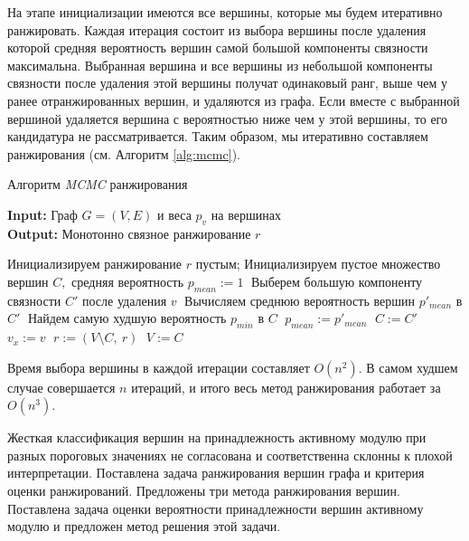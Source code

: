 На этапе инициализации имеются все вершины, которые мы будем итеративно
ранжировать.  Каждая итерация состоит из выбора вершины после удаления которой
средняя вероятность вершин самой большой компоненты связности максимальна.
Выбранная вершина и все вершины из небольшой компоненты связности после
удаления этой вершины получат одинаковый ранг, выше чем у ранее отранжированных
вершин, и удаляются из графа.  Если вместе с выбранной вершиной удаляется
вершина с вероятностью ниже чем у этой вершины, то его кандидатура не
рассматривается. Таким образом, мы итеративно составляем ранжирования (см.
Алгоритм \ref{alg:mcmc}).

\begin{algorithm}
    \caption{Алгоритм \emph{MCMC} ранжирования}
    \label{alg:mcmc}
    \hspace*{\algorithmicindent} \textbf{Input:}  Граф $G=(V, E)$ и веса $p_v$ на вершинах\\
    \hspace*{\algorithmicindent} \textbf{Output:} Монотонно связное ранжирование $r$
    \begin{algorithmic}[1]
        \State Инициализируем ранжирование $r$ пустым;
            \State Инициализируем пустое множество вершин $C,$ средняя вероятность $p_{mean}:=1\;$
                \State Выберем большую компоненту связности $C'$ после удаления $v\;$
                \State Вычисляем среднюю вероятность вершин $p'_{mean}$ в $C'\;$
                \State Найдем самую худшую вероятность $p_{min}$ в $C\;$
                    \State $p_{mean} := p'_{mean}\;$
                    \State $C := C'\;$
                    \State $v_x := v\;$
                \EndIf
            \EndFor
            \State $r := (V \setminus C,~r)\;$
            \State $V := C\;$
        \EndWhile
    \end{algorithmic}
\end{algorithm}

Время выбора вершины в каждой итерации составляет $O(n^2)$.  В самом худшем
случае совершается $n$ итераций, и итого весь метод ранжирования работает за
$O(n^3)$.

\chapterconclusion
Жесткая классификация вершин на принадлежность активному модулю при разных
пороговых значениях не согласована и соответственна склонны к плохой
интерпретации.  Поставлена задача ранжирования вершин графа и критерия оценки
ранжирований. Предложены три метода ранжирования вершин.  Поставлена задача
оценки вероятности принадлежности вершин активному модулю и предложен метод
решения этой задачи.
